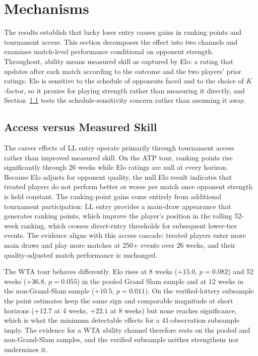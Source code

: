 \section{Mechanisms}
\label{sec:mechanisms}

The results establish that lucky loser entry causes gains in ranking points and tournament access. This section decomposes the effect into two channels and examines match-level performance conditional on opponent strength. Throughout, ability means measured skill as captured by Elo: a rating that updates after each match according to the outcome and the two players' prior ratings. Elo is sensitive to the schedule of opponents faced and to the choice of $K$-factor, so it proxies for playing strength rather than measuring it directly, and Section~\ref{sec:mechanisms_access} tests the schedule-sensitivity concern rather than assuming it away.

\subsection{Access versus Measured Skill}
\label{sec:mechanisms_access}

The career effects of LL entry operate primarily through tournament access rather than improved measured skill. On the ATP tour, ranking points rise significantly through 26 weeks while Elo ratings are null at every horizon. Because Elo adjusts for opponent quality, the null Elo result indicates that treated players do not perform better or worse per match once opponent strength is held constant. The ranking-point gains come entirely from additional tournament participation: LL entry provides a main-draw appearance that generates ranking points, which improve the player's position in the rolling 52-week ranking, which crosses direct-entry thresholds for subsequent lower-tier events. The evidence aligns with this access cascade: treated players enter more main draws and play more matches at 250+ events over 26 weeks, and their quality-adjusted match performance is unchanged.

The WTA tour behaves differently. Elo rises at 8 weeks ($+15.0$, $p = 0.082$) and 52 weeks ($+36.8$, $p = 0.055$) in the pooled Grand Slam sample and at 12 weeks in the non-Grand-Slam sample ($+10.5$, $p = 0.011$). On the verified-lottery subsample the point estimates keep the same sign and comparable magnitude at short horizons ($+12.7$ at 4 weeks, $+22.1$ at 8 weeks) but none reaches significance, which is what the minimum detectable effects for a 41-observation subsample imply. The evidence for a WTA ability channel therefore rests on the pooled and non-Grand-Slam samples, and the verified subsample neither strengthens nor undermines it.

